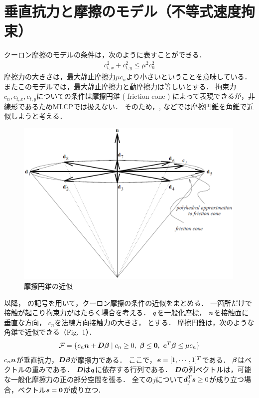 \documentclass{jsarticle}
\begin{document}
\section{垂直抗力と摩擦のモデル（不等式速度拘束）}
クーロン摩擦のモデルの条件は，次のように表すことができる．
\begin{align*}
 c_{t,x}^2+c_{t,y}^2\le \mu^2c_n^2
\end{align*}
摩擦力の大きさは，最大静止摩擦力$\mu c_n$より小さいということを意味している．
またこのモデルでは，最大静止摩擦力と動摩擦力は等しいとする．
拘束力$c_n,c_{t,x}, c_{t,y}$についての条件は摩擦円錐 ( friction cone ) によって表現できるが，非線形であるためMLCPでは扱えない．
そのため，\cite{CMAME1999Anitescu}, \cite{IJNME1996Stewart} などでは摩擦円錐を角錐で近似しようと考える．

\begin{figure}[tb]
  \begin{center}
    \includegraphics[keepaspectratio=true,height=80mm]{friction_cone.eps}
    \caption{摩擦円錐の近似}%
    \label{fig:friction_cone}
  \end{center}
\end{figure}


以降，\cite{IJNME1996Stewart} の記号を用いて，クーロン摩擦の条件の近似をまとめる．
一箇所だけで接触が起こり拘束力がはたらく場合を考える．
$\mbox{\boldmath $q$}$を一般化座標，
$\mbox{\boldmath $n$}$を接触面に垂直な方向，
$c_n$を法線方向接触力の大きさ，
とする．
摩擦円錐は，次のような角錐で近似できる（Fig.~1）．
\begin{align}
 {\cal{F}} = \{ c_n\mbox{\boldmath $n$}+\mbox{\boldmath $D$}\mbox{\boldmath $\beta$} \mid c_n\ge0,~\mbox{\boldmath $\beta$}\le\mbox{\bf 0},~\mbox{\boldmath $e$}^T\mbox{\boldmath $\beta$}\le\mu c_n \}
\end{align}
$c_n\mbox{\boldmath $n$}$が垂直抗力，$\mbox{\boldmath $D$}\mbox{\boldmath $\beta$}$が摩擦力である．
ここで，$\mbox{\boldmath $e$}=[1,\cdots,1]^T$である．
$\mbox{\boldmath $\beta$}$はベクトルの重みである．
$\mbox{\boldmath $D$}$は$\mbox{\boldmath $q$}$に依存する行列である．
$\mbox{\boldmath $D$}$の列ベクトルは，可能な一般化摩擦力の正の部分空間を張る．
全ての$j$について$\mbox{\boldmath $d$}_j^T\mbox{\boldmath $s$}\ge0$が成り立つ場合，ベクトル$\mbox{\boldmath $s$}=\mbox{\bf 0}$が成り立つ．
\end{document}
